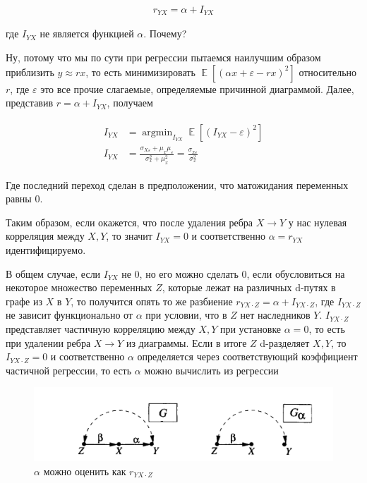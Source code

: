 \documentclass[fleqn]{article}
\DeclareMathOperator{\E}{\mathop\mathbb{E}}
\DeclareMathOperator*{\argmin}{argmin} %
\numberwithin{equation}{section}
\numberwithin{theorem}{section}
\numberwithin{figure}{section}
\numberwithin{lemma}{section}
\numberwithin{corollary}{section}
\begin{document}
\begin{align}
	r_{YX} = \alpha + I_{YX}
\end{align}

где $I_{YX}$ не является функцией $\alpha$. Почему?

Ну, потому что мы по сути при регрессии пытаемся наилучшим образом приблизить $y \approx rx$,  то есть минимизировать $\E[(\alpha x + \varepsilon - rx)^2]$ относительно $r$, где $\varepsilon$ это все прочие слагаемые, определяемые причинной диаграммой. Далее, представив $r = \alpha + I_{YX}$, получаем 

\begin{align}
	\begin{split}
	I_{YX} &= \argmin_{I_{YX}}\E[(I_{YX} - \varepsilon)^2] \\
	I_{YX} &= \frac{\sigma_{X\varepsilon} + \mu_x\mu_\varepsilon}{\sigma_x^2 + \mu_x^2} =  \frac{\sigma_{x\varepsilon}}{\sigma_x^2}
	\end{split}
\end{align}

Где последний переход сделан в предположении, что матожидания переменных равны 0. 

Таким образом, если окажется, что после удаления ребра $X\to Y$ у нас нулевая корреляция между $X,Y$, то значит $I_{YX} = 0$ и соответственно $\alpha = r_{YX}$ идентифицируемо. 

В общем случае, если $I_{YX}$ не 0, но его можно сделать 0, если обусловиться на некоторое множество переменных $Z$, которые лежат на различных d-путях в графе из $X$ в $Y$, то получится опять то же разбиение $r_{YX\cdot Z} = \alpha + I_{YX\cdot Z}$, где $I_{YX\cdot Z}$ не зависит функционально от $\alpha$ при условии, что в $Z$ нет наследников $Y$. $I_{YX\cdot Z}$ представляет частичную корреляцию между $X,Y$ при установке $\alpha = 0$, то есть при удалении ребра $X \to Y$ из диаграммы. Если в итоге $Z$ d-разделяет $X,Y$, то $I_{YX\cdot Z} = 0$ и соответственно $\alpha$ определяется через соответствующий коэффициент частичной регрессии, то есть $\alpha$ можно вычислить из регрессии

\begin{figure}[h]
	\begin{center}
		\includegraphics[scale=0.6]{imgs/img31.png}
	\end{center}
	\caption{$\alpha$ можно оценить как $r_{YX\cdot Z}$}
	\label{fig:path_coef_estimation}
\end{figure}
\end{document}
